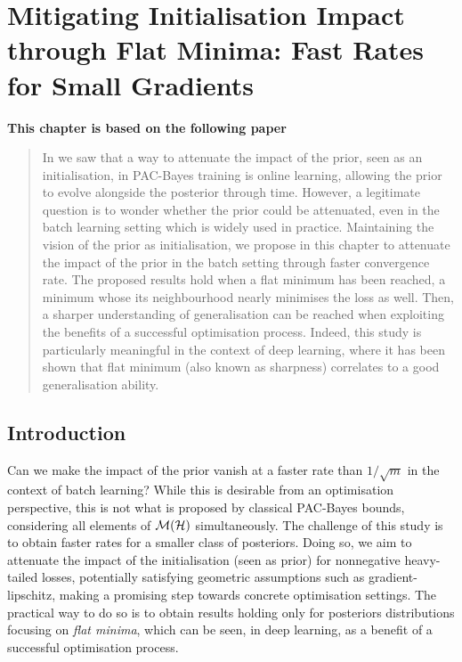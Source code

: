 \chapter[Mitigating Initialisation Impact through Flat Minima: Fast Rates for Small Gradients]{Mitigating Initialisation Impact through Flat Minima: Fast Rates for Small Gradients}
\label{chap:gen-flat-minima}
\addchapterlof
\addchapterloa
\addchapterloe
 
\vspace{-2.0cm}
\begin{center}
\textbf{This chapter is based on the following paper}\\[-0.1cm]
\end{center}


\vspace{0.2cm}
\minitoc

\begin{abstract}
\vspace{-0.2cm}
In  we saw that a way to attenuate the impact of the prior, seen as an initialisation, in PAC-Bayes training is online learning, allowing the prior to evolve alongside the posterior through time. However, a legitimate question is to wonder whether the prior could be attenuated, even in the batch learning setting which is widely used in practice. Maintaining the vision of the prior as initialisation, we propose in this chapter to attenuate the impact of the prior in the batch setting through faster convergence rate. The proposed results hold when a flat minimum has been reached, \ie a minimum whose its neighbourhood nearly minimises the loss as well. Then, a sharper understanding of generalisation can be reached when exploiting the benefits of a successful optimisation process. Indeed, this study is particularly meaningful in the context of deep learning, where it has been shown that flat minimum (also known as sharpness) correlates to a good generalisation ability.  
\end{abstract}

\newpage

\section{Introduction}

Can we make the impact of the prior vanish at a faster rate than $1/\sqrt{m}$ in the context of batch learning? While this is desirable from an optimisation perspective, this is not what is proposed by classical PAC-Bayes bounds, considering all elements of $\mathcal{M}(\mathcal{H})$ simultaneously. The challenge of this study is to obtain faster rates for a smaller class of posteriors. Doing so, we aim to attenuate the impact of the initialisation (seen as prior) for nonnegative heavy-tailed losses, potentially satisfying geometric assumptions such as gradient-lipschitz, making a promising step towards concrete optimisation settings. The practical way to do so is to obtain results holding only for posteriors distributions focusing on \emph{flat minima}, which can be seen, \eg in deep learning, as a benefit of a successful optimisation process.


